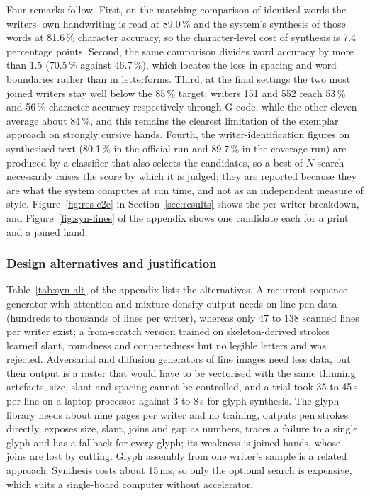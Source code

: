 Four remarks follow.
First, on the matching comparison of identical words the writers' own handwriting is read at 89.0\,\% and the system's synthesis of those words at 81.6\,\% character accuracy, so the character-level cost of synthesis is 7.4 percentage points.
Second, the same comparison divides word accuracy by more than 1.5 (70.5\,\% against 46.7\,\%), which locates the loss in spacing and word boundaries rather than in letterforms.
Third, at the final settings the two most joined writers stay well below the 85\,\% target: writers 151 and 552 reach 53\,\% and 56\,\% character accuracy respectively through G-code, while the other eleven average about 84\,\%, and this remains the clearest limitation of the exemplar approach on strongly cursive hands.
Fourth, the writer-identification figures on synthesised text (80.1\,\% in the official run and 89.7\,\% in the coverage run) are produced by a classifier that also selects the candidates, so a best-of-$N$ search necessarily raises the score by which it is judged; they are reported because they are what the system computes at run time, and not as an independent measure of style.
Figure~\ref{fig:res-e2e} in Section~\ref{sec:results} shows the per-writer breakdown, and Figure~\ref{fig:syn-lines} of the appendix shows one candidate each for a print and a joined hand.

\subsubsection{Design alternatives and justification}

Table~\ref{tab:syn-alt} of the appendix lists the alternatives.
A recurrent sequence generator with attention and mixture-density output \cite{graves2013} needs on-line pen data (hundreds to thousands of lines per writer), whereas only 47 to 138 scanned lines per writer exist; a from-scratch version trained on skeleton-derived strokes learned slant, roundness and connectedness but no legible letters and was rejected.
Adversarial and diffusion generators of line images \cite{kang2020,dai2024} need less data, but their output is a raster that would have to be vectorised with the same thinning artefacts, size, slant and spacing cannot be controlled, and a trial took 35 to 45\,s per line on a laptop processor against 3 to 8\,s for glyph synthesis.
The glyph library needs about nine pages per writer and no training, outputs pen strokes directly, exposes size, slant, joins and gap as numbers, traces a failure to a single glyph and has a fallback for every glyph; its weakness is joined hands, whose joins are lost by cutting.
Glyph assembly from one writer's sample \cite{haines2016} is a related approach.
Synthesis costs about 15\,ms, so only the optional search is expensive, which suits a single-board computer without accelerator.
